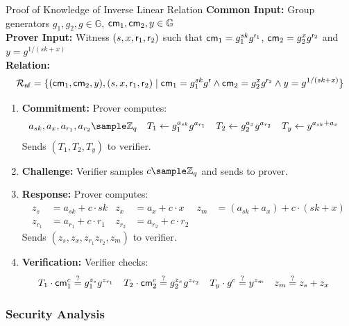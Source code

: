 \begin{protocol}{Proof of Knowledge of Inverse Linear Relation}{}\label{pok-committed-inverse-linear-relation}
\textbf{Common Input:} Group generators $g_1, g_2, g \in \mathbb{G}$, $\mathsf{cm}_1, \mathsf{cm}_2, y \in \mathbb{G}$ \\
\textbf{Prover Input:} Witness $(s, x, \mathsf{r}_1, \mathsf{r}_2)$ such that $\mathsf{cm}_1 = g_1^{sk} g^{\mathsf{r}_1}$, $\mathsf{cm}_2 = g_2^{x}g^{\mathsf{r}_2}$ and $ y = g^{1/(sk + x)}$ \\
\textbf{Relation: }
\[
\mathcal{R}_{\mathsf{nf}} = \{(\mathsf{cm}_1,\mathsf{cm}_2, y), (s, x, \mathsf{r}_1, \mathsf{r}_2) \mid \mathsf{cm}_1 = g_1^{sk} g^{\mathsf{r}} \wedge \mathsf{cm}_2 = g_2^{x}g^{\mathsf{r}_2} \wedge y = g^{1/(sk + x)}\}
\]
\begin{enumerate}
    \item \textbf{Commitment:} Prover computes:
    \begin{align*}
        a_{sk}, a_x, a_{r_1}, a_{r_2} &\sample \Z_q & T_1 &\gets g_1^{a_{sk}} g^{a_{r_1}} & T_2 &\gets g_2^{a_x} g^{a_{r_2}} & T_y &\gets y^{a_{sk} + a_x}
    \end{align*}
    Sends $(T_1, T_2, T_y)$ to verifier.
    
    \item \textbf{Challenge:} Verifier samples $c \sample \mathbb{Z}_q$ and sends to prover.
    
    \item \textbf{Response:} Prover computes:
     \begin{align*}
        z_{s} &= a_{sk} + c \cdot sk & z_x &= a_x + c \cdot x &  z_m &= (a_{sk} + a_x) + c \cdot (sk + x)\\   
        z_{r_1} &= a_{r_1} + c \cdot r_1 & z_{r_2} &= a_{r_2} + c \cdot r_2
    \end{align*}
    Sends $(z_{s}, z_x, z_{r_1} z_{r_2}, z_m)$ to verifier.
    
    \item \textbf{Verification:} Verifier checks:
    \begin{align*}
        T_1 \cdot \mathsf{cm}_1^c &\stackrel{?}{=} g_1^{z_{s}}g^{z_{r_1}} 
        &
        T_2 \cdot \mathsf{cm}_2^c &\stackrel{?}{=}  g_2^{z_x} g^{z_{r_2}} 
        &
        T_y \cdot g^c &\stackrel{?}{=} y^{z_m} &
        z_m &\stackrel{?}{=} z_{s} + z_x
    \end{align*}
\end{enumerate}
\end{protocol}


\subsubsection{Security Analysis}

